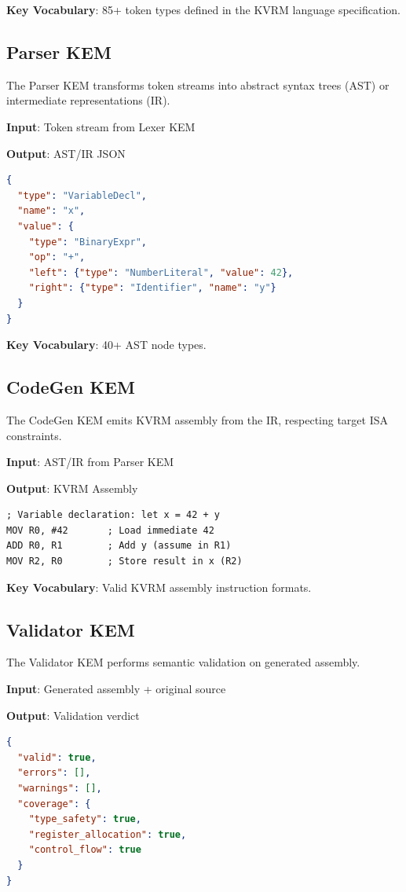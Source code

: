 \documentclass[11pt]{article}
\begin{document}
\textbf{Key Vocabulary}: 85+ token types defined in the KVRM language specification.

\subsection{Parser KEM}

The Parser KEM transforms token streams into abstract syntax trees (AST) or intermediate representations (IR).

\textbf{Input}: Token stream from Lexer KEM

\textbf{Output}: AST/IR JSON
\begin{lstlisting}[language=json]
{
  "type": "VariableDecl",
  "name": "x",
  "value": {
    "type": "BinaryExpr",
    "op": "+",
    "left": {"type": "NumberLiteral", "value": 42},
    "right": {"type": "Identifier", "name": "y"}
  }
}
\end{lstlisting}

\textbf{Key Vocabulary}: 40+ AST node types.

\subsection{CodeGen KEM}

The CodeGen KEM emits KVRM assembly from the IR, respecting target ISA constraints.

\textbf{Input}: AST/IR from Parser KEM

\textbf{Output}: KVRM Assembly
\begin{lstlisting}
; Variable declaration: let x = 42 + y
MOV R0, #42       ; Load immediate 42
ADD R0, R1        ; Add y (assume in R1)
MOV R2, R0        ; Store result in x (R2)
\end{lstlisting}

\textbf{Key Vocabulary}: Valid KVRM assembly instruction formats.

\subsection{Validator KEM}

The Validator KEM performs semantic validation on generated assembly.

\textbf{Input}: Generated assembly + original source

\textbf{Output}: Validation verdict
\begin{lstlisting}[language=json]
{
  "valid": true,
  "errors": [],
  "warnings": [],
  "coverage": {
    "type_safety": true,
    "register_allocation": true,
    "control_flow": true
  }
}
\end{lstlisting}
\end{document}
